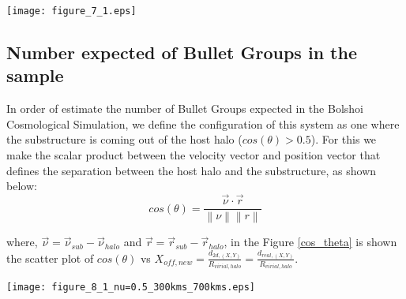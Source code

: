 \documentclass[12pt,preprint]{aastex}
\begin{document}
\begin{figure*}
\begin{center}
\texttt{[image: figure\_7\_1.eps]}
\end{center}
\caption{Cumulative distribution (P$>d_{2d,(X,Y)}$) of displacements for the projection (X,Y). {\bf Left panel:} Sample with $\nu_{max}>700$ kms$^{-1}$ 
for different redshifts. The vertical dashed line, correspond to the separation between dark matter to dark matter estimate
in this work as the double of separation between the collisional gas and dark matter of 124$\pm$20 kpc reported
by \citet{gastaldello} for the group SL2S J08544-0121. 
{\bf Right panel:} Sample with $300 $ kms$^{-1} <\nu_{max}<700 $ kms$^{-1}$ for different redshifts.} 
\label{displacements}
\end{figure*}


\subsection{Number expected of Bullet Groups in the sample}


In order of estimate the number of Bullet Groups expected in the Bolshoi Cosmological Simulation, we 
define the configuration of this system as one where the substructure is coming out of the host halo ($cos(\theta)>0.5$). For this 
we make the scalar product between the velocity vector and position vector that defines the separation between 
 the host halo and the substructure, as shown below: \\
 
 \begin{equation}
  cos(\theta)=\frac{\vec{\nu{}}\cdotp{}\vec{r}}{\left\|\nu{}\right\| \left\|r\right\|}
 \end{equation}

where, $\vec{\nu{}}=\vec{\nu}_{sub}-\vec{\nu}_{halo}$ and $\vec{r}=\vec{r}_{sub}-\vec{r}_{halo}$, in the Figure \ref{cos_theta}
is shown the scatter plot of $cos(\theta{})$ vs $X_{off,new}=\frac{d_{2d,(X,Y)}}{R_{virial,halo}}=\frac{d_{real,(X,Y)}}{R_{virial,halo}}$.  


\begin{figure*}
\begin{center}
\texttt{[image: figure\_8\_1\_nu=0.5\_300kms\_700kms.eps]}
\end{center}
\caption{Scatter of $cos(\theta)$ vs $X_{off,new}$. The red dashed line correpond to the limit for $cos(\theta{})>0.5$,  
where the substructure is emerging from the host halo and  $\left(\frac{\nu_{circ,sub}}{\nu_{circ,halo}}\right)\geq0.5$, 
cicular velocities $<700$ kms$^{-1}$ and different redshifts.} 
\label{cos_theta}
\end{figure*}
\end{document}
